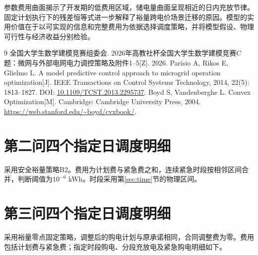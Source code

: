 \documentclass[UTF8,a4paper,zihao=-4,fontset=fandol]{ctexart}
\begin{document}
参数费用曲面揭示了开发期的低费用区域，储电量曲面呈现相近的日内充放节律。固定计划执行下的残差恒等式进一步解释了裕量跨电价场景迁移的原因。模型的实用价值在于以可实现的信息和完整费用为依据选择调度策略，并将模型假设、物理可行性与经济收益分别检验。

\begin{thebibliography}{9}
 全国大学生数学建模竞赛组委会. 2026年高教社杯全国大学生数学建模竞赛C题：微网与外部电网电力调控策略及附件1--5[Z]. 2026.
 Parisio A, Rikos E, Glielmo L. A model predictive control approach to microgrid operation optimization[J]. IEEE Transactions on Control Systems Technology, 2014, 22(5): 1813--1827. DOI: \href{https://doi.org/10.1109/TCST.2013.2295737}{10.1109/TCST.2013.2295737}.
 Boyd S, Vandenberghe L. Convex Optimization[M]. Cambridge: Cambridge University Press, 2004. \url{https://web.stanford.edu/~boyd/cvxbook/}.
\end{thebibliography}
\clearpage

\appendix\small
\FloatBarrier
\section{第二问四个指定日调度明细}
采用安全裕量策略B2。费用为计划费与紧急费之和，连续紧急时段按相邻区间合并，判断阈值为$10^{-6}$ kWh。时段采用第\ref{sec:time}节的物理区间。


\clearpage
\FloatBarrier
\section{第三问四个指定日调度明细}
采用裕量零点固定策略，调整后的购电计划与原承诺相同，合同调整费为零。费用包括计划费与紧急费；指定时段购电、分段充放电及紧急购电明细如下。


\clearpage

\end{document}
